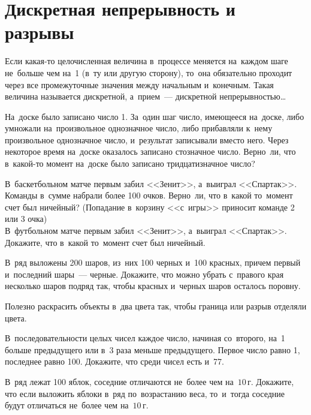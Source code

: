 
\section*{Дискретная непрерывность и разрывы}



Если какая-то целочисленная величина в~процессе меняется на~каждом шаге
не~больше чем на~1 (в~ту или другую сторону), то~она обязательно проходит через
все промежуточные значения между начальным и~конечным.
Такая величина называется дискретной, а~прием~---
дискретной непрерывностью\ldots

\begin{problems}

\item
На~доске было записано число 1.
За~один шаг число, имеющееся на~доске, либо умножали на~произвольное
однозначное число, либо прибавляли к~нему произвольное однозначное число,
и~результат записывали вместо него.
Через некоторое время на~доске оказалось записано стозначное число.
Верно~ли, что в~какой-то момент на~доске было записано тридцатизначное число?

\item
\subproblem
В~баскетбольном матче первым забил <<Зенит>>, а~выиграл <<Спартак>>.
Команды в~сумме набрали более 100 очков.
Верно~ли, что в~какой то~момент счет был ничейный?
(Попадание в~корзину <<с~игры>> приносит команде 2 или 3 очка)
\\
\subproblem
В~футбольном матче первым забил <<Зенит>>, а~выиграл <<Спартак>>.
Докажите, что в~какой то~момент счет был ничейный.

\item
В~ряд выложены 200 шаров, из~них 100 черных и~100 красных, причем первый
и~последний шары~--- черные.
Докажите, что можно убрать с~правого края несколько шаров подряд так, чтобы
красных и~черных шаров осталось поровну.

\end{problems}

Полезно раскрасить объекты в~два цвета так, чтобы граница или разрыв отделяли
цвета.

\begin{problems}

\item
В~последовательности целых чисел каждое число, начиная со~второго, на~1 больше
предыдущего или в~3 раза меньше предыдущего.
Первое число равно 1, последнее равно 100.
Докажите, что среди чисел есть и~77.


\item
В~ряд лежат 100 яблок, соседние отличаются не~более чем на~$10\,\text{г}$.
Докажите, что если выложить яблоки в~ряд по~возрастанию веса, то~и~тогда
соседние будут отличаться не~более чем на~$10\,\text{г}$.

\end{problems}

